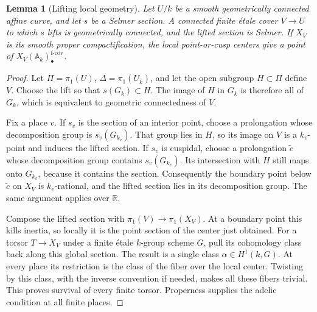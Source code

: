 \documentclass[11pt,a4paper]{article}
\newcommand{\A}{\mathbb A}
\newcommand{\R}{\mathbb R}
\newcommand{\kbar}{\overline{k}}
\newcommand{\et}{\'et}
\newcommand{\fcov}{\mathrm{f\text{-}cov}}
\theoremstyle{plain}
\newtheorem{lemma}[theorem]{Lemma}
\theoremstyle{definition}
\begin{document}
\begin{lemma}[Lifting local geometry]\label{lem:lifting}
Let $U/k$ be a smooth geometrically connected affine curve, and let $s$
be a Selmer section. A connected finite \et ale cover $V\to U$ to which
$s$ lifts is geometrically connected, and the lifted section is Selmer.
If $X_V$ is its smooth proper compactification, the local point-or-cusp
centers give a point of $X_V(\A_k)_\bullet^{\fcov}$.
\end{lemma}
\begin{proof}
Let $\Pi=\pi_1(U)$, $\Delta=\pi_1(U_{\kbar})$, and let the open subgroup
$H\subset\Pi$ define $V$. Choose the lift so that $s(G_k)\subset H$.
The image of $H$ in $G_k$ is therefore all of $G_k$, which is equivalent
to geometric connectedness of $V$.

Fix a place $v$. If $s_v$ is the section of an interior point, choose a
prolongation whose decomposition group is $s_v(G_{k_v})$. That group
lies in $H$, so its image on $V$ is a $k_v$-point and induces the lifted
section. If $s_v$ is cuspidal, choose a prolongation $\widetilde c$
whose decomposition group contains $s_v(G_{k_v})$. Its intersection
with $H$ still maps onto $G_{k_v}$, because it contains the section.
Consequently the boundary point below $\widetilde c$ on $X_V$ is
$k_v$-rational, and the lifted section lies in its decomposition group.
The same argument applies over $\R$.

Compose the lifted section with $\pi_1(V)\to\pi_1(X_V)$. At a boundary
point this kills inertia, so locally it is the point section of the
center just obtained. For a torsor $T\to X_V$ under a finite \et ale
$k$-group scheme $G$, pull its cohomology class back along this global
section. The result is a single class $\alpha\in H^1(k,G)$. At every
place its restriction is the class of the fiber over the local center.
Twisting by this class, with the inverse convention if needed, makes
all these fibers trivial. This proves survival of every finite torsor.
Properness supplies the adelic condition at all finite places.
\end{proof}
\end{document}
